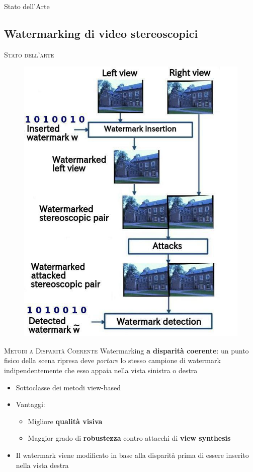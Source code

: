\documentclass{beamer}
\begin{document}
\begin{section}{Stato dell'Arte}
\subsection{Watermarking di video stereoscopici}
\begin{frame}[t]{\textsc{Stato dell'arte}}
\vspace{1em}
\begin{figure}
\includegraphics[keepaspectratio=true,width=0.5\linewidth]{./img/views_domain.jpeg}
\end{figure}
\end{frame}




\begin{frame}[t]{\textsc{Metodi a Disparit\`{a} Coerente}}
\vspace{1em}
\centering
Watermarking \textbf{a disparit\`{a} coerente}: un punto fisico della scena ripresa deve \textit{portare} lo stesso campione di watermark indipendentemente che esso appaia nella vista sinistra o destra 
\begin{center}
\begin{itemize}
\item Sottoclasse dei metodi view-based
\item Vantaggi:
	\begin{itemize}
	\item Migliore \textbf{qualit\`{a} visiva}
	\item Maggior grado di \textbf{robustezza} contro attacchi di \textbf{view synthesis}
	\end{itemize}
\item Il watermark viene modificato in base alla disparit\`{a} prima di essere inserito nella vista destra 
\end{itemize}
\end{center}
\end{frame}
 
 

\end{section}
\end{document}
